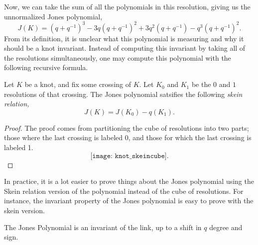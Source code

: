 Now, we can take the sum of all the polynomials in this resolution, giving us the unnormalized Jones polynomial, 
\[J(K)= (q+q^{-1})^3-3q(q+q^{-1})^2+3q^2(q+q^{-1})-q^3(q+q^{-1})^2.\]
From its definition, it is unclear what this polynomial is measuring and why it should be a knot invariant. Instead of computing this invariant by taking all of the resolutions simultaneously, one may compute this polynomial with the following recursive formula. 
\begin{claim}
Let $K$ be a knot, and fix some crossing of $K$. Let $K_0$ and $K_1$ be the $0$ and $1$ resolutions of that crossing. The Jones polynomial satsifies the following \emph{skein relation,}
\[J(K)=J(K_0)-q(K_1).\]
\end{claim}
\begin{proof}
The proof comes from partitioning the cube of resolutions into two parts; those where the last crossing is labeled 0, and those for which the last crossing is labeled 1. 
\[\texttt{[image: knot\_skeincube]}.\]
\end{proof}
In practice, it is a lot easier to prove things about the Jones polynomial using the Skein relation version of the polynomial instead of the cube of resolutions. For instance, the invariant property of the Jones polynomial is easy to prove with the skein version. 
\begin{theorem} The Jones Polynomial is an invariant of the link, up to a shift in $q$ degree and sign.
\end{theorem}

